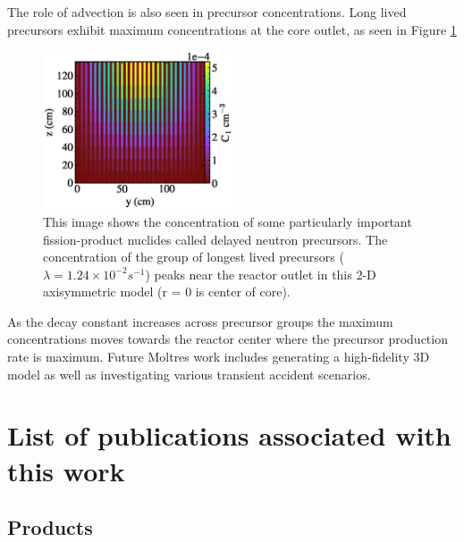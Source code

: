 \documentclass[letterpaper]{article}
\begin{document}
The role of advection is also seen in precursor
concentrations. Long lived precursors exhibit maximum concentrations at the
core outlet, as seen in Figure \ref{fig:pre1}


\begin{figure}[htb]
        \begin{center}
                \includegraphics[width=0.5\textwidth]{pre1.eps}
        \end{center}
        \caption{This image shows the concentration of some particularly 
        important fission-product nuclides called delayed neutron precursors.  
        The concentration of the group of longest lived precursors ($\lambda = 
        1.24\times{10}^{-2}{s}^{-1}$) peaks near the reactor outlet in this 2-D 
        axisymmetric model (r = 0 is center of core).} 
        \label{fig:pre1}
\end{figure}

As the decay constant increases across precursor groups the maximum
concentrations moves towards the reactor center where the precursor production
rate is maximum. Future Moltres work includes generating a high-fidelity 3D
model as well as investigating various transient accident scenarios.
\FloatBarrier

\section{List of publications associated with this work}



\subsection{Products}
\end{document}
